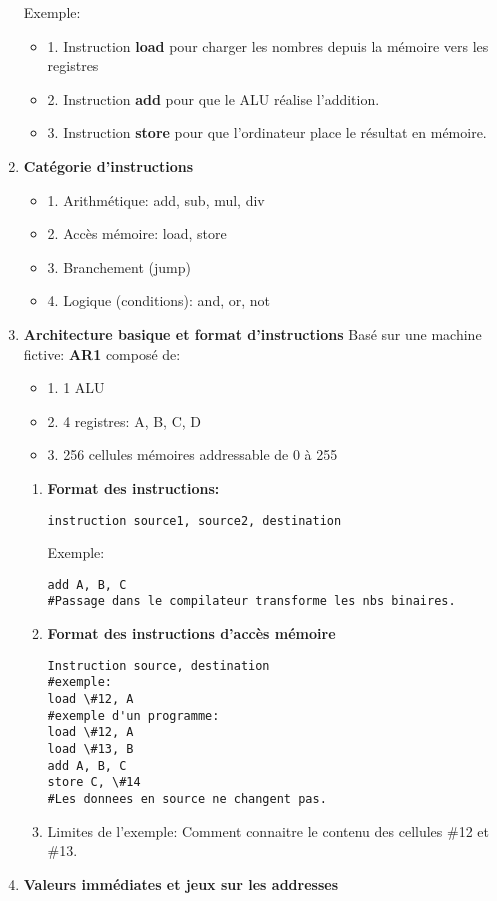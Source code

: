 \begin{enumerate}
Exemple: 
\begin{itemize}
  \item1. Instruction \textbf{load} pour charger les nombres depuis la mémoire vers les registres
  \item 2. Instruction \textbf{add} pour que le ALU réalise l'addition.
  \item 3. Instruction \textbf{store} pour que l'ordinateur place le résultat en mémoire.
\end{itemize}
\item \textbf{Catégorie d'instructions}
\begin{itemize}
  \item 1. Arithmétique: add, sub, mul, div
  \item 2. Accès mémoire: load, store
  \item 3. Branchement (jump)
  \item 4. Logique (conditions): and, or, not
\end{itemize}
\item \textbf{Architecture basique et format d'instructions}
Basé sur une machine fictive: \textbf{AR1} composé de:
\begin{itemize}
  \item 1. 1 ALU
  \item 2. 4 registres: A, B, C, D
  \item 3. 256 cellules mémoires addressable de 0 à 255
\end{itemize}
\begin{enumerate}
\item \textbf{Format des instructions:} 
\begin{lstlisting}
instruction source1, source2, destination
\end{lstlisting}
Exemple: 
\begin{lstlisting}
add A, B, C 
#Passage dans le compilateur transforme les nbs binaires.
\end{lstlisting}
\item \textbf{Format des instructions d'accès mémoire}
\begin{lstlisting}
Instruction source, destination
#exemple:
load \#12, A
#exemple d'un programme:
load \#12, A
load \#13, B
add A, B, C
store C, \#14
#Les donnees en source ne changent pas.
\end{lstlisting}
\item Limites de l'exemple: 
Comment connaitre le contenu des cellules \#12 et \#13.
\end{enumerate}
\item \textbf{Valeurs immédiates et jeux sur les addresses}

\end{enumerate}
